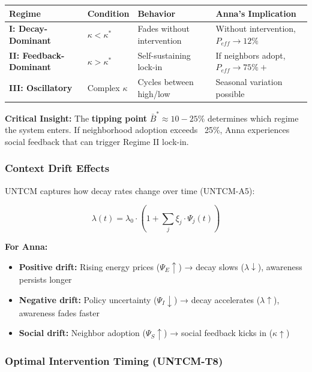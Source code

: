 \begin{center}
\renewcommand{\arraystretch}{1.3}
\begin{tabular}{@{}llll@{}}
\toprule
\textbf{Regime} & \textbf{Condition} & \textbf{Behavior} & \textbf{Anna's Implication} \\
\midrule
\textbf{I: Decay-Dominant} & $\kappa < \kappa^*$ & Fades without intervention & Without intervention, $P_{eff} \to 12\%$ \\
\textbf{II: Feedback-Dominant} & $\kappa > \kappa^*$ & Self-sustaining lock-in & If neighbors adopt, $P_{eff} \to 75\%+$ \\
\textbf{III: Oscillatory} & Complex $\kappa$ & Cycles between high/low & Seasonal variation possible \\
\bottomrule
\end{tabular}
\end{center}

\textbf{Critical Insight:} The \textbf{tipping point} $\bar{B}^* \approx 10-25\%$ determines which regime the system enters. If neighborhood adoption exceeds ~25\%, Anna experiences social feedback that can trigger Regime II lock-in.

\subsubsection{Context Drift Effects}

UNTCM captures how decay rates change over time (UNTCM-A5):

\begin{equation}
\lambda(t) = \lambda_0 \cdot \left(1 + \sum_j \xi_j \cdot \Psi_j(t)\right)
\end{equation}

\textbf{For Anna:}
\begin{itemize}[nosep]
\item \textbf{Positive drift:} Rising energy prices ($\Psi_E \uparrow$) → decay slows ($\lambda \downarrow$), awareness persists longer
\item \textbf{Negative drift:} Policy uncertainty ($\Psi_I \downarrow$) → decay accelerates ($\lambda \uparrow$), awareness fades faster
\item \textbf{Social drift:} Neighbor adoption ($\Psi_S \uparrow$) → social feedback kicks in ($\kappa \uparrow$)
\end{itemize}

\subsubsection{Optimal Intervention Timing (UNTCM-T8)}

